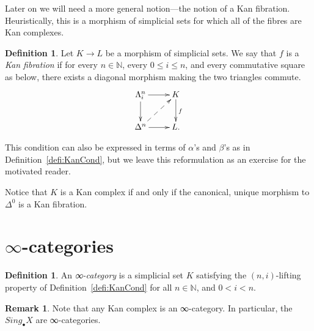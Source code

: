 \documentclass[a4paper]{amsart}
\numberwithin{figure}{section}
\theoremstyle{theorem}
\theoremstyle{definition}
\newtheorem{defi}[thm]{Definition}
\newtheorem{rema}[thm]{Remark}
\newcommand{\NN}{\mathbb{N}}
\begin{document}
Later on we will need a more general notion---the notion of a Kan fibration. Heuristically, this is a morphism of simplicial sets for which all of the fibres are Kan complexes. \\

\begin{mdframed}
\begin{defi}
Let $K \to L$ be a morphism of simplicial sets. We say that $f$ is a \emph{Kan fibration} if for every $n \in \NN$, every $0 \leq i \leq n$, and every commutative square as below, there exists a diagonal morphism making the two triangles commute. 
\[ \xymatrix{
\Lambda^n_i \ar[d] \ar[r] & K \ar[d]^f \\
\Delta^n \ar[r] \ar@{-->}[ur] & L.
} \]
\end{defi}
\end{mdframed}

This condition can also be expressed in terms of $\alpha$'s and $\beta$'s as in Definition~\ref{defi:KanCond}, but  we leave this reformulation as an exercise for the motivated reader.

Notice that $K$ is a Kan complex if and only if the canonical, unique morphism to $\Delta^0$ is a Kan fibration. 

\section{$∞$-categories}

\begin{mdframed}
\begin{defi}
An \emph{∞-category} is a simplicial set $K$ satisfying the $(n, i)$-lifting property of Definition~\ref{defi:KanCond} for all $n \in \NN$, and $0 < i < n$. 
\end{defi}
\end{mdframed}

\begin{rema}
Note that any Kan complex is an ∞-category. In particular, the $Sing_\bullet X$ are ∞-categories.
\end{rema}
\end{document}
